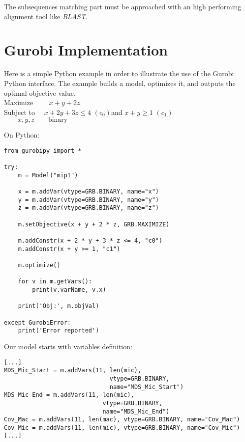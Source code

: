 The subsequences matching part must be approached with an high performing alignment tool like \textit{BLAST}.

\section{Gurobi Implementation}

Here is a simple Python example in order to illustrate the use of the Gurobi Python interface. The example builds a model, optimizes it, and outputs the optimal objective value. \\

\noindent Maximize $\qquad x + y + 2 z$ \\
Subject to $\quad x + 2 y + 3 z \leq  4$ $(c_0)$\quad and $x + y \geq 1 $ $(c_1)$\\
$\qquad x, y, z \qquad \text{binary}$ \\

\clearpage

On Python:

\begin{verbatim}
from gurobipy import *

try:
    m = Model("mip1")

    x = m.addVar(vtype=GRB.BINARY, name="x")
    y = m.addVar(vtype=GRB.BINARY, name="y")
    z = m.addVar(vtype=GRB.BINARY, name="z")

    m.setObjective(x + y + 2 * z, GRB.MAXIMIZE)

    m.addConstr(x + 2 * y + 3 * z <= 4, "c0")
    m.addConstr(x + y >= 1, "c1")

    m.optimize()

    for v in m.getVars():
        print(v.varName, v.x)

    print('Obj:', m.objVal)

except GurobiError:
    print('Error reported')
\end{verbatim}

Our model starts with variables definition:
\begin{verbatim}
[...]
MDS_Mic_Start = m.addVars(11, len(mic),
                              vtype=GRB.BINARY,
                              name="MDS_Mic_Start")
MDS_Mic_End = m.addVars(11, len(mic),
                            vtype=GRB.BINARY,
                            name="MDS_Mic_End")
Cov_Mac = m.addVars(11, len(mac), vtype=GRB.BINARY, name="Cov_Mac")
Cov_Mic = m.addVars(11, len(mic), vtype=GRB.BINARY, name="Cov_Mic")
[...]
\end{verbatim}

